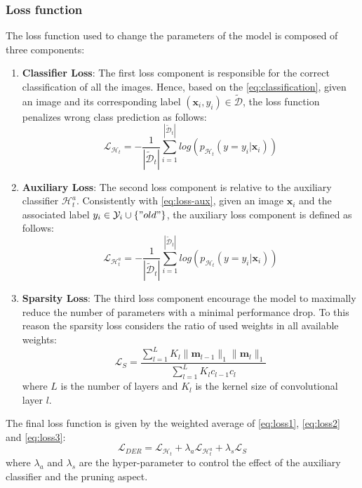 \subsubsection{Loss function}
The loss function used to change the parameters of the model is composed of three components:

\begin{enumerate}
    \item \textbf{Classifier Loss}: The first loss component is responsible for the correct classification of all the images. Hence, based on the \autoref{eq:classification}, given an image and its corresponding label $(\textbf{x}_i, y_i)\in \tilde{\mathcal{D}}$, the loss function penalizes wrong class prediction as follows:
    \begin{equation} \label{eq:loss1}
        \mathcal{L}_{\mathcal{H}_t} = - \frac{1}{|\tilde{\mathcal{D}}_t|}
            \sum_{i=1}^{|\tilde{\mathcal{D}}_t|}log(p_{\mathcal{H}_t}(y=y_i | \textbf{x}_i))
    \end{equation}
    \item \textbf{Auxiliary Loss}: The second loss component is relative to the auxiliary classifier $\mathcal{H}_t^a$. Consistently with \autoref{eq:loss-aux}, given an image $\textbf{x}_i$ and the associated label $y_i \in \mathcal{Y}_i \cup \{"old"\}$, the auxiliary loss component is defined as follows:
    \begin{equation} \label{eq:loss2}
        \mathcal{L}_{\mathcal{H}_t^a} = - \frac{1}{|\tilde{\mathcal{D}}_t|}
            \sum_{i=1}^{|\tilde{\mathcal{D}}_t|}log(p_{\mathcal{H}_t}(y=y_i | \textbf{x}_i))
    \end{equation}
    \item \textbf{Sparsity Loss}: The third loss component encourage the model to maximally reduce the number of parameters with a minimal performance drop. To this reason the sparsity loss considers the ratio of used weights in all available weights:
    \begin{equation} \label{eq:loss3}
        \mathcal{L}_S = \frac{\sum_{l=1}^L K_l \| \textbf{m}_{l-1} \|_1  \| \textbf{m}_{l} \|_1 }{\sum_{l=1}^L K_l c_{l-1} c_{l}}
    \end{equation}
    where $L$ is the number of layers and $K_l$ is the kernel size of convolutional layer $l$.
\end{enumerate}

The final loss function is given by the weighted average of \autoref{eq:loss1}, \autoref{eq:loss2} and \autoref{eq:loss3}:
\begin{equation}
    \mathcal{L}_{DER} = \mathcal{L}_{\mathcal{H}_t} + \lambda_a \mathcal{L}_{\mathcal{H}_t^a} + \lambda_s \mathcal{L}_{S}
\end{equation}
where $\lambda_a$ and $\lambda_s$ are the hyper-parameter to control the effect of the auxiliary classifier and the pruning aspect.

